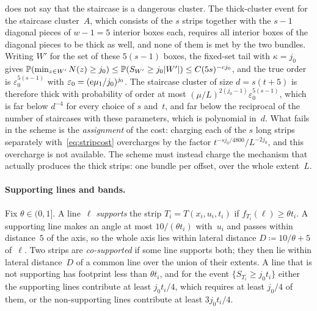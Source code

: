 \documentclass[11pt,letterpaper]{article}
\begin{document}
 does not say that the staircase is a dangerous cluster. The thick-cluster event for the staircase cluster~$A$, which consists of the $s$ strips together with the $s-1$ diagonal pieces of $w-1=5$ interior boxes each, requires all interior boxes of the diagonal pieces to be thick as well, and none of them is met by the two bundles. Writing $W'$ for the set of these $5(s-1)$ boxes, the fixed-set tail with $\kappa=j_0$ gives $\P(\min_{z\in W'}N(z)\ge j_0)\le\P(S_{W'}\ge j_0\lvert W'\rvert)\le C(5s)^{-cj_0}$, and the true order is $\varepsilon_0^{5(s-1)}$ with $\varepsilon_0=(\e\mu_1/j_0)^{j_0}$. The staircase cluster of size $d=s(t+5)$ is therefore thick with probability of order at most $(\mu/L)^{2(j_0-1)}\varepsilon_0^{5(s-1)}$, which is far below $d^{-4}$ for every choice of $s$ and~$t$, and far below the reciprocal of the number of staircases with these parameters, which is polynomial in~$d$. What fails in the scheme is the \emph{assignment} of the cost: charging each of the $s$ long strips separately with~\eqref{eq:stripcost} overcharges by the factor $t^{-sj_0/4800}/L^{-2j_0}$, and this overcharge is not available. The scheme must instead charge the mechanism that actually produces the thick strips: one bundle per offset, over the whole extent~$L$.

\paragraph{Supporting lines and bands.} Fix $\theta\in(0,1]$. A line~$\ell$ \emph{supports} the strip $T_i=T(x_i,u_i,t_i)$ if $f_{T_i}(\ell)\ge\theta t_i$. A supporting line makes an angle at most $10/(\theta t_i)$ with~$u_i$ and passes within distance~$5$ of the axis, so the whole axis lies within lateral distance $D\coloneqq10/\theta+5$ of~$\ell$. Two strips are \emph{co-supported} if some line supports both; they then lie within lateral distance~$D$ of a common line over the union of their extents. A line that is not supporting has footprint less than $\theta t_i$, and for the event $\{S_{T_i}\ge j_0t_i\}$ either the supporting lines contribute at least $j_0t_i/4$, which requires at least $j_0/4$ of them, or the non-supporting lines contribute at least $3j_0t_i/4$.
\end{document}
